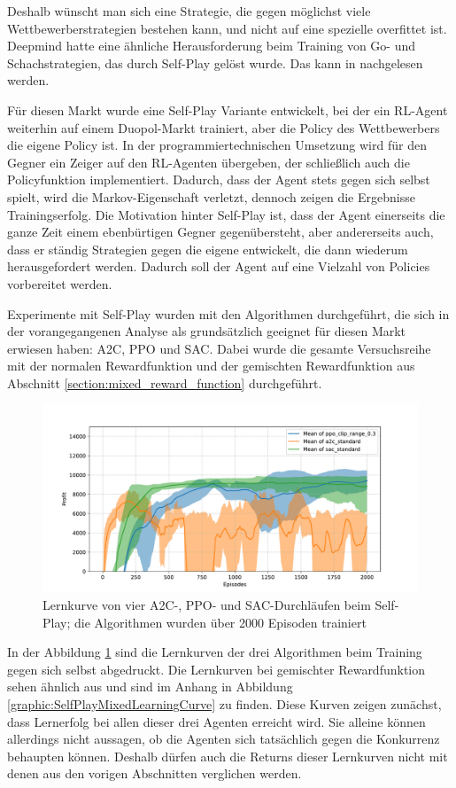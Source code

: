 Deshalb wünscht man sich eine Strategie, die gegen möglichst viele Wettbewerberstrategien bestehen kann, und nicht auf eine spezielle overfittet ist.
Deepmind hatte eine ähnliche Herausforderung beim Training von Go- und Schachstrategien, das durch Self-Play gelöst wurde. 
Das kann in \cite{Silver2017, https://doi.org/10.48550/arxiv.1712.01815} nachgelesen werden.

Für diesen Markt wurde eine Self-Play Variante entwickelt, bei der ein RL-Agent weiterhin auf einem Duopol-Markt trainiert, aber die Policy des Wettbewerbers die eigene Policy ist.
In der programmiertechnischen Umsetzung wird für den Gegner ein Zeiger auf den RL-Agenten übergeben, der schließlich auch die Policyfunktion implementiert.
Dadurch, dass der Agent stets gegen sich selbst spielt, wird die Markov-Eigenschaft verletzt, dennoch zeigen die Ergebnisse Trainingserfolg.
Die Motivation hinter Self-Play ist, dass der Agent einerseits die ganze Zeit einem ebenbürtigen Gegner gegenübersteht, aber andererseits auch, dass er ständig Strategien gegen die eigene entwickelt, die dann wiederum herausgefordert werden.
Dadurch soll der Agent auf eine Vielzahl von Policies vorbereitet werden.

Experimente mit Self-Play wurden mit den Algorithmen durchgeführt, die sich in der vorangegangenen Analyse als grundsätzlich geeignet für diesen Markt erwiesen haben: A2C, PPO und SAC.
Dabei wurde die gesamte Versuchsreihe mit der normalen Rewardfunktion und der gemischten Rewardfunktion aus Abschnitt \ref{section:mixed_reward_function} durchgeführt.

\begin{figure}[htb]
	\centering
	\includegraphics[width=\textwidth]{main/self_play.pdf}
	\caption{Lernkurve von vier A2C-, PPO- und SAC-Durchläufen beim Self-Play; die Algorithmen wurden über 2000 Episoden trainiert}
	\label{graphic:SelfPlayLearningCurve}
\end{figure}
In der Abbildung \ref{graphic:SelfPlayLearningCurve} sind die Lernkurven der drei Algorithmen beim Training gegen sich selbst abgedruckt.
Die Lernkurven bei gemischter Rewardfunktion sehen ähnlich aus und sind im Anhang in Abbildung \ref{graphic:SelfPlayMixedLearningCurve} zu finden.
Diese Kurven zeigen zunächst, dass Lernerfolg bei allen dieser drei Agenten erreicht wird.
Sie alleine können allerdings nicht aussagen, ob die Agenten sich tatsächlich gegen die Konkurrenz behaupten können.
Deshalb dürfen auch die Returns dieser Lernkurven nicht mit denen aus den vorigen Abschnitten verglichen werden.

